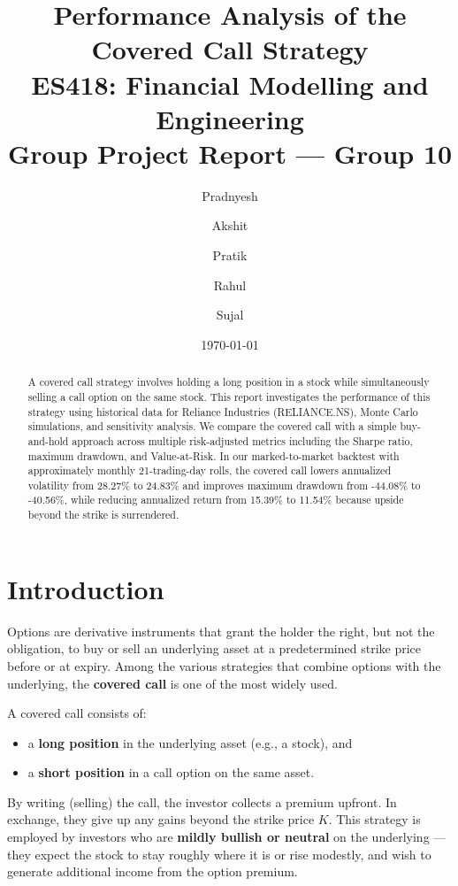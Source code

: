 \documentclass[12pt, a4paper]{article}
\title{
    \textbf{Performance Analysis of the Covered Call Strategy} \\[0.5em]
    \large ES418: Financial Modelling and Engineering \\
    Group Project Report — Group 10
}
\author{
    Pradnyesh \and Akshit \and Pratik \and Rahul \and Sujal
}
\date{\today}
\begin{document}
\maketitle
\thispagestyle{empty}

\begin{abstract}
A covered call strategy involves holding a long position in a stock while simultaneously selling a call option on the same stock. This report investigates the performance of this strategy using historical data for Reliance Industries (RELIANCE.NS), Monte Carlo simulations, and sensitivity analysis. We compare the covered call with a simple buy-and-hold approach across multiple risk-adjusted metrics including the Sharpe ratio, maximum drawdown, and Value-at-Risk. In our marked-to-market backtest with approximately monthly 21-trading-day rolls, the covered call lowers annualized volatility from 28.27\% to 24.83\% and improves maximum drawdown from -44.08\% to -40.56\%, while reducing annualized return from 15.39\% to 11.54\% because upside beyond the strike is surrendered.
\end{abstract}

\tableofcontents
\newpage

\section{Introduction}

Options are derivative instruments that grant the holder the right, but not the obligation, to buy or sell an underlying asset at a predetermined strike price before or at expiry. Among the various strategies that combine options with the underlying, the \textbf{covered call} is one of the most widely used.

A covered call consists of:
\begin{itemize}
    \item a \textbf{long position} in the underlying asset (e.g., a stock), and
    \item a \textbf{short position} in a call option on the same asset.
\end{itemize}

By writing (selling) the call, the investor collects a premium upfront. In exchange, they give up any gains beyond the strike price $K$. This strategy is employed by investors who are \textbf{mildly bullish or neutral} on the underlying — they expect the stock to stay roughly where it is or rise modestly, and wish to generate additional income from the option premium.
\end{document}
